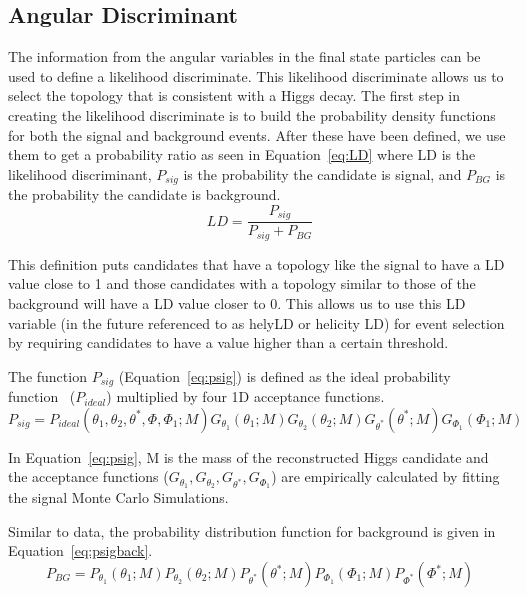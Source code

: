 \subsection{Angular Discriminant}

The information from the angular variables in the final state particles can be used to define a likelihood discriminate.  This likelihood discriminate allows us to select the topology that is consistent with a Higgs decay.  The first step in creating the likelihood discriminate is to build the probability density functions  for both the signal and background events.  After these have been defined, we use them to get a probability ratio as seen in Equation~\ref{eq:LD} where LD is the likelihood discriminant, $P_{sig}$ is the probability the candidate is signal, and $P_{BG}$ is the probability the candidate is background.
  \begin{equation} LD = \dfrac{P_{sig}}{P_{sig}+P_{BG}} \label{eq:LD}\end{equation}

This definition puts candidates that have a topology like the signal to have a LD value close to 1 and those candidates with a topology similar to those of the background will have a LD value closer to 0.  This allows us to use this LD variable (in the future referenced to as helyLD or helicity LD) for event selection by requiring candidates to have a value higher than a certain threshold.

The function $P_{sig}$ (Equation~\ref{eq:psig}) is defined as the ideal probability function~\cite{PhysRevD.81.075022} ($P_{ideal}$) multiplied by four 1D acceptance functions.  
\begin{equation} P_{sig} = P_{ideal}(\theta_1, \theta_2, \theta^*, \Phi, \Phi_1 ;M)G_{\theta_1}(\theta_1;M)G_{\theta_2}(\theta_2;M)G_{\theta^*}(\theta^*;M)G_{\Phi_1}(\Phi_1;M) \label{eq:psig}\end{equation}

In Equation~\ref{eq:psig}, M is the mass of the reconstructed Higgs candidate and the acceptance functions ($G_{\theta_1},G_{\theta_2},G_{\theta^*},G_{\Phi_1}$) are empirically calculated by fitting the signal Monte Carlo Simulations.

Similar to data, the probability distribution function for background is given in Equation~\ref{eq:psigback}.
\begin{equation} P_{BG} = P_{\theta_1}(\theta_1;M)P_{\theta_2}(\theta_2;M)P_{\theta^*}(\theta^*;M)P_{\Phi_1}(\Phi_1;M)P_{\Phi^*}(\Phi^*;M) \label{eq:psigback}\end{equation}

